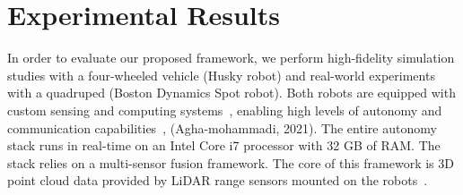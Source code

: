 \documentclass[letterpaper]{article} %
\newcommand{\ph}[1]{{\textbf{#1}:}} %
\begin{document}




\section{Experimental Results}\label{sec:exp_results}
In order to evaluate our proposed framework, we perform high-fidelity simulation studies with a four-wheeled vehicle (Husky robot) and real-world experiments with a quadruped (Boston Dynamics Spot robot). Both robots are equipped with custom sensing and computing systems~\cite{AutoSpot}, enabling high levels of autonomy and communication capabilities~\cite{Otsu2020}, (Agha-mohammadi, 2021). The entire autonomy stack runs in real-time on an Intel Core i7 processor with 32 GB of RAM. The stack relies on a multi-sensor fusion framework. The core of this framework is 3D point cloud data provided by LiDAR range sensors mounted on the robots~\cite{Ebadi2020}.
\end{document}
